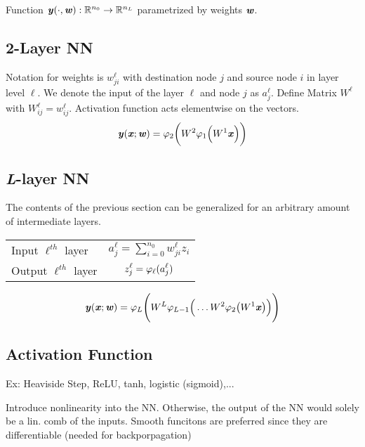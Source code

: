Function $\textbf{\textit{y}}(\cdot,\textbf{\textit{w}}): \mathbb{R}^{n_0}\rightarrow\mathbb{R}^{n_L}$ parametrized by weights $\textbf{\textit{w}}$.

\subsection{2-Layer NN}
    Notation for weights is $w_{ji}^\ell$ with destination node $j$ and source node $i$ in layer level $\ell$. We denote the input of the layer $\ell$ and node $j$ as $a_j^\ell$.
    Define Matrix $W^\ell$ with $W_{ij}^\ell = w_{ij}^\ell$. Activation function acts elementwise on the vectors.
    \begin{equation*}
        \textbf{\textit{y}}(\textbf{\textit{x}};\textbf{\textit{w}}) = \varphi_2\bigg(W^2\varphi_1\Big(W^1\textbf{\textit{x}}\Big)\bigg)
    \end{equation*}
\subsection{\textit{L}-layer NN}
    The contents of the previous section can be generalized for an arbitrary amount of intermediate layers.
     \begin{center}
            \renewcommand{\arraystretch}{1.3}{\begin{tabular}{l|c}
                Input $\ell^{th}$ layer & $\displaystyle a_j^\ell = \sum_{i=0}^{n_0} w_{ji}^\ell z_i$\\
                Output $\ell^{th}$ layer & $\displaystyle z_j^\ell = \varphi_{\ell}(a_j^\ell)$
            \end{tabular}}
    \end{center}
    \begin{equation*}
        \textbf{\textit{y}}(\textbf{\textit{x}};\textbf{\textit{w}}) = \varphi_L\Bigg(W^L\varphi_{L-1}\Big(\dots W^2\varphi_2\big(W^1\textbf{\textit{x}}\big)\Big)\Bigg)
    \end{equation*}

\subsection{Activation Function}
    Ex: Heaviside Step, ReLU, tanh, logistic (sigmoid),...
    
    Introduce nonlinearity into the NN. Otherwise, the output of the NN would solely be a lin. comb of the inputs. Smooth funcitons are preferred since they are differentiable (needed for backporpagation)
    
